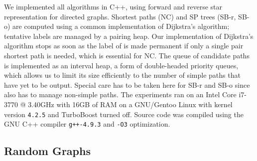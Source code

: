 \documentclass[runningheads,a4paper]{llncs}
\begin{document}
We implemented all algorithms in C++, using forward and reverse star representation for directed graphs.
Shortest paths (NC) and SP trees (SB-r, SB-o) are computed using a common implementation of Dijkstra's algorithm; tentative labels are managed by a pairing heap.
Our implementation of Dijkstra's algorithm stops as soon as the label of  is made permanent if only a single pair shortest path is needed, which is essential for NC.
The queue of candidate paths  is implemented as an interval heap, a form of double-headed priority queues, which allows us to limit its size efficiently to the number of simple paths that have yet to be output.
Special care has to be taken here for SB-r and SB-o since  also has to manage non-simple paths.
The experiments ran on an Intel Core i7-3770 @ 3.40GHz with 16GB of RAM on a GNU/Gentoo Linux with kernel version \texttt{4.2.5} and TurboBoost turned off.
Source code was compiled using the GNU C++ compiler \texttt{g++-4.9.3} and \texttt{-O3} optimization.

\subsection{Random Graphs}
\label{sec:random-graphs}
\end{document}
